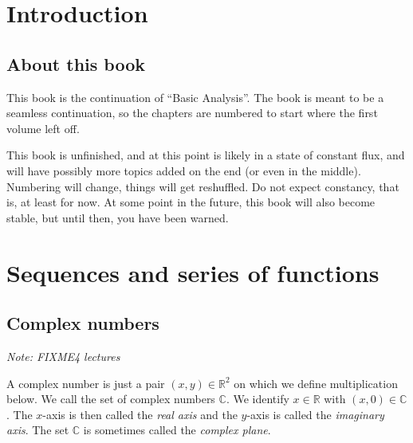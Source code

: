 \documentclass[12pt]{book}
\newcommand{\C}{{\mathbb{C}}}
\newcommand{\R}{{\mathbb{R}}}
\newcommand{\sectionnotes}[1]{\noindent \emph{Note: #1} \medskip \par}
\theoremstyle{plain}
\theoremstyle{remark}
\theoremstyle{definition}
\theoremstyle{exercise}
\theoremstyle{example}
\begin{document}
\chapter*{Introduction}


\section*{About this book}

This book is the continuation of ``Basic Analysis''.  The book is meant to
be a seamless continuation, so the chapters are numbered to start where the
first volume left off.

This book is unfinished, and at this point is likely in a state of
constant flux, and will have possibly more topics added on the end (or even
in the middle).
Numbering will
change, things will get reshuffled.  Do not expect constancy, that is,
at least for now.  At
some point in the future, this book will also become stable, but until then,
you have been warned.




\chapter{Sequences and series of functions} \label{seqser:chapter}


\section{Complex numbers}
\label{sec:complexnums}

\sectionnotes{FIXME4 lectures}

A complex number is just a pair $(x,y) \in \R^2$ on which we define
multiplication below.
We call the set of complex numbers $\C$.
We identify $x \in \R$ with $(x,0) \in \C$.
The $x$-axis is then called the \emph{real axis} and the $y$-axis is
called the \emph{imaginary axis}.  The set $\C$ is sometimes called the
\emph{complex plane}.
\end{document}
